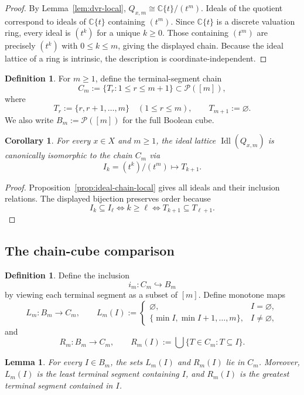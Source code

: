\documentclass[11pt,a4paper]{article}
\numberwithin{equation}{section}
\newtheorem{lemma}[theorem]{Lemma}
\newtheorem{corollary}[theorem]{Corollary}
\theoremstyle{definition}
\newtheorem{definition}[theorem]{Definition}
\theoremstyle{remark}
\DeclareMathOperator{\Idl}{Idl}
\newcommand{\CC}{\mathbb C}
\newcommand{\cP}{\mathcal P}
\newcommand{\into}{\hookrightarrow}
\begin{document}
\begin{proof}
By Lemma~\ref{lem:dvr-local}, $Q_{x,m}\cong\CC\{t\}/(t^m)$.  Ideals of the quotient correspond to ideals of $\CC\{t\}$ containing $(t^m)$.  Since $\CC\{t\}$ is a discrete valuation ring, every ideal is $(t^k)$ for a unique $k\ge0$.  Those containing $(t^m)$ are precisely $(t^k)$ with $0\le k\le m$, giving the displayed chain.  Because the ideal lattice of a ring is intrinsic, the description is coordinate-independent.
\end{proof}

\begin{definition}
For $m\ge1$, define the terminal-segment chain
\[
C_m:=\{T_r:1\le r\le m+1\}\subset \cP([m]),
\]
where
\[
T_r:=\{r,r+1,\dots,m\}\quad (1\le r\le m),
\qquad
T_{m+1}:=\varnothing.
\]
We also write $B_m:=\cP([m])$ for the full Boolean cube.
\end{definition}

\begin{corollary}\label{cor:ideal-chain-identification}
For every $x\in X$ and $m\ge1$, the ideal lattice $\Idl(Q_{x,m})$ is canonically isomorphic to the chain $C_m$ via
\[
I_k=(t^k)/(t^m)\longmapsto T_{k+1}.
\]
\end{corollary}

\begin{proof}
Proposition~\ref{prop:ideal-chain-local} gives all ideals and their inclusion relations.  The displayed bijection preserves order because
\[
I_k\subseteq I_\ell\iff k\ge\ell
\iff T_{k+1}\subseteq T_{\ell+1}.
\]
\end{proof}

\subsection{The chain-cube comparison}

\begin{definition}
Define the inclusion
\[
i_m:C_m\into B_m
\]
by viewing each terminal segment as a subset of $[m]$.  Define monotone maps
\[
L_m:B_m\to C_m,
\qquad
L_m(I):=\begin{cases}
\varnothing,& I=\varnothing,\\
\{\min I,\min I+1,\dots,m\},& I\neq\varnothing,
\end{cases}
\]
and
\[
R_m:B_m\to C_m,
\qquad
R_m(I):=\bigcup\{T\in C_m:T\subseteq I\}.
\]
\end{definition}

\begin{lemma}\label{lem:LRtails}
For every $I\in B_m$, the sets $L_m(I)$ and $R_m(I)$ lie in $C_m$.  Moreover, $L_m(I)$ is the least terminal segment containing $I$, and $R_m(I)$ is the greatest terminal segment contained in $I$.
\end{lemma}
\end{document}
